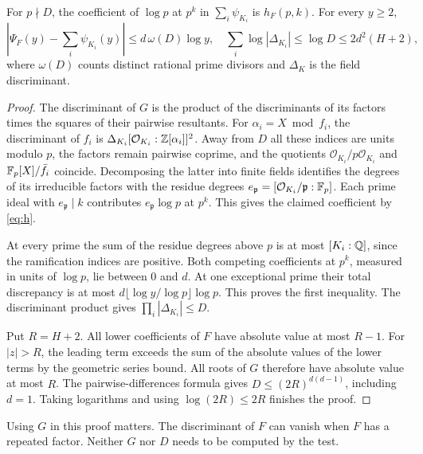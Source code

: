 \documentclass[11pt]{article}
\begin{document}
\begin{lemma}\label{lem:exception}
For \(p\nmid D\), the coefficient of \(\log p\) at \(p^k\) in \(\sum_i\psi_{K_i}\) is \(h_F(p,k)\). For every \(y\ge2\),
\[
 \left|\Psi_F(y)-\sum_i\psi_{K_i}(y)\right|\le d\,\omega(D)\log y,\quad
 \sum_i\log|\Delta_{K_i}|\le\log D\le 2d^2(H+2),
\]
where \(\omega(D)\) counts distinct rational prime divisors and \(\Delta_K\) is the field discriminant.
\end{lemma}
\begin{proof}
The discriminant of \(G\) is the product of the discriminants of its factors times the squares of their pairwise resultants. For \(\alpha_i=X\bmod f_i\), the discriminant of \(f_i\) is \(\Delta_{K_i}[\mathcal O_{K_i}:\mathbb Z[\alpha_i]]^2\). Away from \(D\) all these indices are units modulo \(p\), the factors remain pairwise coprime, and the quotients \(\mathcal O_{K_i}/p\mathcal O_{K_i}\) and \(\mathbb F_p[X]/\bar f_i\) coincide. Decomposing the latter into finite fields identifies the degrees of its irreducible factors with the residue degrees \(e_{\mathfrak p}=[\mathcal O_{K_i}/\mathfrak p:\mathbb F_p]\). Each prime ideal with \(e_{\mathfrak p}\mid k\) contributes \(e_{\mathfrak p}\log p\) at \(p^k\). This gives the claimed coefficient by \eqref{eq:h}.

At every prime the sum of the residue degrees above \(p\) is at most \([K_i:\mathbb Q]\), since the ramification indices are positive. Both competing coefficients at \(p^k\), measured in units of \(\log p\), lie between \(0\) and \(d\). At one exceptional prime their total discrepancy is at most \(d\lfloor \log y/\log p\rfloor\log p\). This proves the first inequality. The discriminant product gives \(\prod_i|\Delta_{K_i}|\le D\).

Put \(R=H+2\). All lower coefficients of \(F\) have absolute value at most \(R-1\). For \(|z|>R\), the leading term exceeds the sum of the absolute values of the lower terms by the geometric series bound. All roots of \(G\) therefore have absolute value at most \(R\). The pairwise-differences formula gives \(D\le(2R)^{d(d-1)}\), including \(d=1\). Taking logarithms and using \(\log(2R)\le2R\) finishes the proof.
\end{proof}
Using \(G\) in this proof matters. The discriminant of \(F\) can vanish when \(F\) has a repeated factor. Neither \(G\) nor \(D\) needs to be computed by the test.
\newpage
\end{document}
